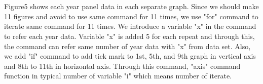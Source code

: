 \begin{itemize}
	\\
	
	\\
	
	Figure5 shows each year panel data in each separate graph. Since we should make 11 figures and avoid to use same command for 11 times, we use "for" command to iterate same command for 11 times. We introduce a variable "x" in the command to refer each year data.  Variable "x" is added 5 for each repeat and through this, the command can refer same number of year data with "x" from data set. Also, we add "if" command to add tick mark to 1st, 5th, and 9th graph in vertical axis and 8th to 11th in horizontal axis. Through this command, "axis" command function in typical number of variable "i" which means number of iterate.
	
\end{itemize}